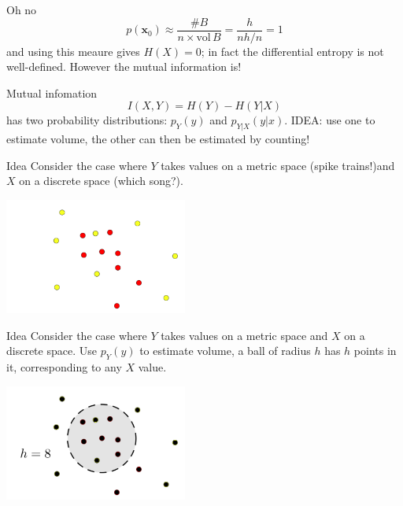 \documentclass{beamer}
\begin{document}
\begin{frame}{Oh no}
\color{dark}
$$p(\mathbf{x}_0)\approx\frac{\#B}{n\times \mbox{vol}\,B}=\frac{h}{nh/n}=1$$
\color{black}
and using this meaure gives $H(X)=0$; in fact the
  differential entropy is not well-defined. However the
  mutual information is!
\end{frame}


\begin{frame}{Mutual infomation}
\color{dark}
$$I(X,Y)=H(Y)-H(Y|X)$$ 
\color{black}
has two probability distributions: $p_Y(y)$ and
  $p_{Y|X}(y|x)$.
\vskip 1cm
IDEA: use one to estimate volume, the other can then
  be estimated by counting!
\end{frame}


\begin{frame}{Idea}
  \vskip 1cm
Consider the case where $Y$ takes values on a metric space (\color{reddish}spike trains!\color{black})and $X$ on a discrete space (\color{reddish}which song?\color{black}).
\color{black}
\begin{center}
\includegraphics[width=6cm]{dots_simple.png}
\end{center}
\end{frame}



\begin{frame}{Idea}
  \vskip 1cm
Consider the case where $Y$ takes values on a metric space and $X$ on a discrete space.
  \vskip 1cm
  Use $p_Y(y)$ to estimate volume, a ball of radius $h$ has $h$ points in it, corresponding to any $X$ value.
\begin{center}
\includegraphics[width=6cm]{dots_black.png}
\end{center}
\end{frame}
\end{document}
